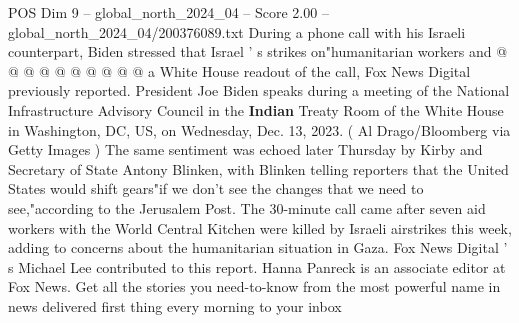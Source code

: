 \begin{textsample}{POS Dim 9 – global\_north\_2024\_04 – Score 2.00 – global\_north\_2024\_04/200376089.txt}
During a phone call with his Israeli counterpart, Biden stressed that Israel ' s strikes on"humanitarian workers and @ @ @ @ @ @ @ @ @ @ a White House readout of the call, Fox News Digital previously reported.
President Joe Biden speaks during a meeting of the National Infrastructure Advisory Council in the \textbf{Indian} Treaty Room of the White House in Washington, DC, US, on Wednesday, Dec. 13, 2023. ( Al Drago/Bloomberg via Getty Images ) The same sentiment was echoed later Thursday by Kirby and Secretary of State Antony Blinken, with Blinken telling reporters that the United States would shift gears"if we don't see the changes that we need to see,"according to the Jerusalem Post.
The 30-minute call came after seven aid workers with the World Central Kitchen were killed by Israeli airstrikes this week, adding to concerns about the humanitarian situation in Gaza.
Fox News Digital ' s Michael Lee contributed to this report.
Hanna Panreck is an associate editor at Fox News.
Get all the stories you need-to-know from the most powerful name in news delivered first thing every morning to your inbox

\end{textsample}
